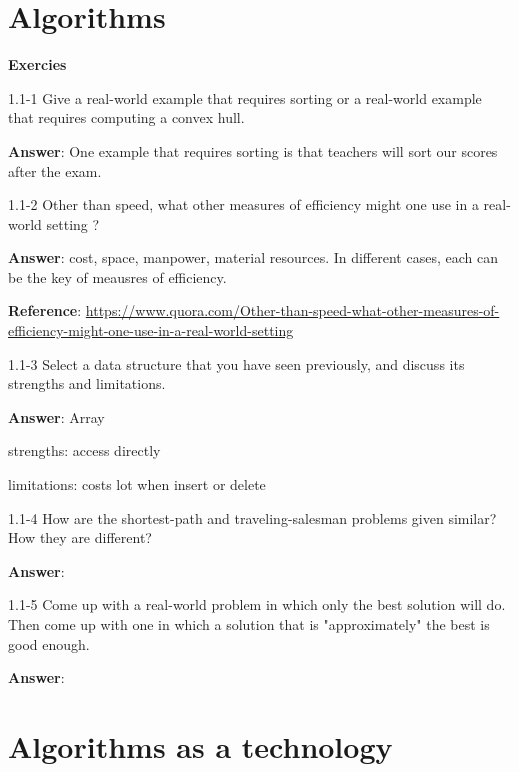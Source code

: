\section {Algorithms}

\textbf { \color {red} Exercies }

\vspace{1em}

1.1-1 Give a real-world example that requires sorting or
a real-world example that requires computing a convex hull.

\vspace{1em}

\textbf{Answer}: One example that requires sorting is that teachers will sort our
scores after the exam.

\vspace{1em}

1.1-2 Other than speed, what other measures of efficiency
might one use in a real-world setting ?

\vspace{1em}

\textbf{Answer}: cost, space, manpower, material resources. In different cases,
each can be the key of meausres of efficiency.

\textbf{Reference}: \href{https://www.quora.com/Other-than-speed-what-other-measures-of-efficiency-might-one-use-in-a-real-world-setting}{https://www.quora.com/Other-than-speed-what-other-measures-of-efficiency-might-one-use-in-a-real-world-setting}

\vspace{1em}

1.1-3 Select a data structure that you have seen previously, and discuss
its strengths and limitations.

\vspace{1em}

\textbf{Answer}: Array

strengths: access directly

limitations: costs lot when insert or delete

\vspace{1em}

1.1-4 How are the {\color{blue}shortest-path} and {\color{blue}traveling-salesman}
problems given {\color{blue}similar}? How they are {\color{blue}different}?

\vspace{1em}

\textbf{Answer}: 

\vspace{1em}

1.1-5 Come up with a real-world problem in which only the best solution
will do. Then come up with one in which a solution that is "approximately" the best
is good enough.

\vspace{1em}

\textbf{Answer}: 

\section {Algorithms as a technology}

